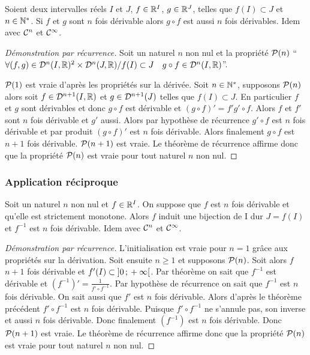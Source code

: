 \begin{theo}
  Soient deux intervalles réels \(I\) et \(J\), \(f \in \R^I\), \(g \in \R^J\),
  telles que \(f(I) \subset J\) et \(n \in \N^*\). Si \(f\) et \(g\) sont \(n\)
  fois dérivable alors \(g \circ f\) est aussi \(n\) fois dérivables. Idem avec
  \(\classe{n}\) et \(\classe{\infty}\).
\end{theo}
\begin{proof}[Démonstration par récurrence]
  Soit un naturel \(n\) non nul et la propriété \(\P(n)\) ``\(\forall (f,g) \in
  \derivnfois{n}{I}{\R}^2 \times \derivnfois{n}{J}{\R} / f(I)\subset J \quad g
  \circ f \in \derivnfois{n}{I}{\R}\)''.

  \(\P(1)\) est vraie d'après les propriétés sur la dérivée. Soit \(n \in
  \N^*\), supposons \(\P(n)\) alors soit \(f \in \derivnfois{n+1}{I}{\R}\) et
  \(g \in \Dr^{n+1}(J)\) telles que \(f(I) \subset J\). En particulier \(f\) et
  \(g\) sont dérivables et donc \(g \circ f\) est dérivable et \((g \circ f)'=f'
  g' \circ f\). Alors \(f\) et \(f'\) sont \(n\) fois dérivable et \(g'\) aussi.
  Alors par hypothèse de récurrence \(g' \circ f\) est \(n\) fois dérivable et
  par produit \((g \circ f)'\) est \(n\) fois dérivable. Alors finalement \(g
  \circ f\) est \(n+1\) fois dérivable. \(\P(n+1)\) est vraie. Le théorème de
  récurrence affirme donc que la propriété \(\P(n)\) est vraie pour tout naturel
  \(n\) non nul.
\end{proof}

\subsubsection{Application réciproque}

\begin{theo}
  Soit un naturel \(n\) non nul et \(f \in \R^I\). On suppose que \(f\) est
  \(n\) fois dérivable et qu'elle est strictement monotone. Alors \(f\) induit
  une bijection de I dur \(J=f(I)\) et \(f^{-1}\) est \(n\) fois dérivable. Idem
  avec \(\classe{n}\) et \(\classe{\infty}\).
\end{theo}
\begin{proof}[Démonstration par récurrence]
  L'initialisation est vraie pour \(n=1\) grâce aux propriétés sur la
  dérivation. Soit ensuite \(n \geqslant 1\) et supposons \(\P(n)\). Soit alors
  \(f\) \(n+1\) fois dérivable et \(f'(I) \subset \intervalleoo{0}{+\infty}\).
  Par théorème on sait que \(f^{-1}\) est dérivable et
  \((f^{-1})'=\frac{1}{f' \circ f^{-1}}\).
  Par hypothèse de récurrence on sait que \(f^{-1}\) est \(n\) fois dérivable.
  On sait aussi que \(f'\) est \(n\) fois dérivable. Alors d'après le théorème
  précédent \(f' \circ f^{-1}\) est \(n\) fois dérivable. Puisque \(f' \circ
  f^{-1}\) ne s'annule pas, son inverse et aussi \(n\) fois dérivable. Donc
  finalement \((f^{-1})\) est \(n\) fois dérivable. Donc \(\P(n+1)\) est vraie.
  Le théorème de récurrence affirme donc que la propriété \(\P(n)\) est vraie
  pour tout naturel \(n\) non nul.
\end{proof}

